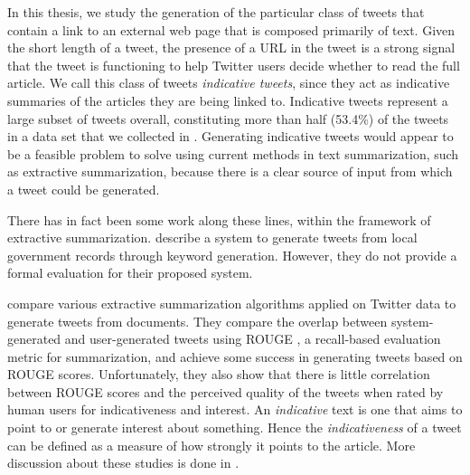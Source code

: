 In this thesis, we study the generation of the particular class of tweets that contain a link to an external web page that is composed primarily of text. Given the short length of a tweet, the presence of a URL in the tweet is a strong signal that the tweet is functioning to help Twitter users decide whether to read the full article. We call this class of tweets \emph{indicative tweets}, since they act as indicative summaries of the articles they are being linked to. Indicative tweets represent a large subset of tweets overall, constituting more than half (53.4\%) of the tweets in a data set that we collected in . Generating indicative tweets would appear to be a feasible problem to solve using current methods in text summarization, such as extractive summarization, because there is a clear source of input from which a tweet could be generated. 


There has in fact been some work along these lines, within the framework of extractive summarization. \cite{lofi2012iparticipate} describe a system to generate tweets from local government records through keyword generation. However, they do not provide a formal evaluation for their proposed system.

\cite{lloret2013towards} compare various extractive summarization algorithms applied on Twitter data to generate tweets from documents. They compare the overlap between system-generated and user-generated tweets using ROUGE 
\citep{lin2004rouge}, a recall-based evaluation metric for summarization, and achieve some success in generating tweets based on ROUGE scores. Unfortunately, they also show that there is little correlation between ROUGE scores and the perceived quality of the tweets when rated by human users for indicativeness and interest. An \textit{indicative} text is one that aims to point to or generate interest about something. Hence the \textit{indicativeness} of a tweet can be defined as a measure of how strongly it points to the article. More discussion about these studies is done in .

